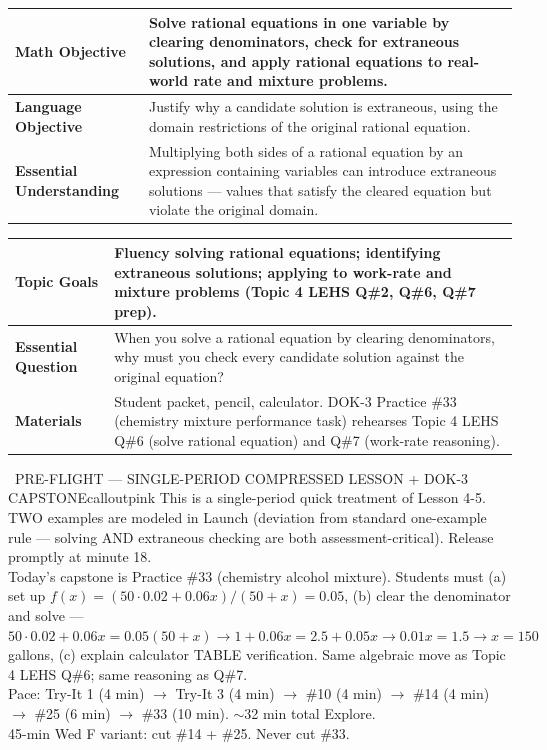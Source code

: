\documentclass[11pt]{article}
\newcommand{\lessonrow}[2]{\textbf{#1} & #2 \\ \hline}
\begin{document}

{\small
\renewcommand{\arraystretch}{1.25}
\noindent\begin{tabular}{|p{1.8in}|p{4.8in}|}
\hline
\lessonrow{Math Objective}{Solve rational equations in one variable by clearing denominators, check for extraneous solutions, and apply rational equations to real-world rate and mixture problems.}
\lessonrow{Language Objective}{Justify why a candidate solution is extraneous, using the domain restrictions of the original rational equation.}
\lessonrow{Essential Understanding}{Multiplying both sides of a rational equation by an expression containing variables can introduce extraneous solutions --- values that satisfy the cleared equation but violate the original domain.}
\end{tabular}
}

{\small
\renewcommand{\arraystretch}{1.25}
\noindent\begin{tabular}{|p{1.8in}|p{4.8in}|}
\hline
\lessonrow{Topic Goals}{Fluency solving rational equations; identifying extraneous solutions; applying to work-rate and mixture problems (Topic 4 LEHS Q\#2, Q\#6, Q\#7 prep).}
\lessonrow{Essential Question}{When you solve a rational equation by clearing denominators, why must you check every candidate solution against the original equation?}
\lessonrow{Materials}{Student packet, pencil, calculator. DOK-3 Practice \#33 (chemistry mixture performance task) rehearses Topic 4 LEHS Q\#6 (solve rational equation) and Q\#7 (work-rate reasoning).}
\end{tabular}
}

\begin{callout}{\IconPin\ PRE-FLIGHT --- SINGLE-PERIOD COMPRESSED LESSON + DOK-3 CAPSTONE}{calloutpink}
This is a single-period quick treatment of Lesson 4-5. TWO examples are modeled in Launch (deviation from standard one-example rule --- solving AND extraneous checking are both assessment-critical). Release promptly at minute 18.\\
Today's capstone is Practice \#33 (chemistry alcohol mixture). Students must (a) set up \(f(x) = (50\cdot0.02 + 0.06x)/(50+x) = 0.05\), (b) clear the denominator and solve --- \(50\cdot0.02 + 0.06x = 0.05(50+x) \rightarrow 1 + 0.06x = 2.5 + 0.05x \rightarrow 0.01x = 1.5 \rightarrow x = 150\) gallons, (c) explain calculator TABLE verification. Same algebraic move as Topic 4 LEHS Q\#6; same reasoning as Q\#7.\\
Pace: Try-It 1 (4 min) \(\rightarrow\) Try-It 3 (4 min) \(\rightarrow\) \#10 (4 min) \(\rightarrow\) \#14 (4 min) \(\rightarrow\) \#25 (6 min) \(\rightarrow\) \#33 (10 min). \(\sim\)32 min total Explore.\\
45-min Wed F variant: cut \#14 + \#25. Never cut \#33.
\end{callout}
\end{document}
